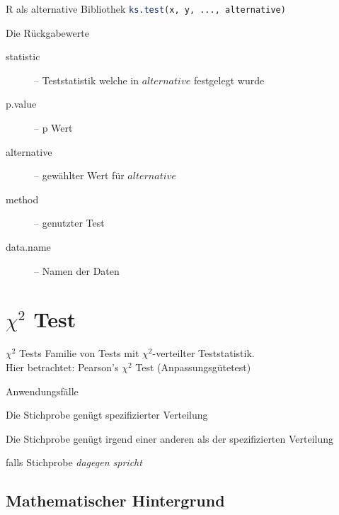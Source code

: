 \documentclass{beamer}
\begin{document}
\begin{frame}{\insertsubsection}

\begin{block}{R als alternative Bibliothek}
	\lstinline[language=R] $ks.test(x, y, ..., alternative)$
\end{block}

\begin{block}{Die Rückgabewerte}
\begin{description}
	\item[statistic] -- Teststatistik welche in $alternative$ festgelegt wurde
	\item[p.value] -- p Wert
	\item[alternative] -- gewählter Wert für $alternative$
	\item[method] -- genutzter Test
	\item[data.name] -- Namen der Daten
\end{description}
\end{block}

\end{frame}

\section{$\chi^2$ Test}
\begin{frame}{\insertsection}
\begin{block}{$\chi^2$ Tests}
	Familie von Tests mit $\chi^2$-verteilter Teststatistik.
	\\
	Hier betrachtet: Pearson's $\chi^2$ Test (Anpassungsgütetest)
\end{block}
\begin{block}{Anwendungsfälle}
	\begin{description}[Alternativhypothese]
	\item[Nullhypothese] Die Stichprobe genügt spezifizierter Verteilung
	\item[Alternativhypothese] Die Stichprobe genügt irgend einer anderen als der spezifizierten Verteilung
	\item[Verwerfen von $H_0$] falls Stichprobe \emph{dagegen spricht}
	\end{description}
\end{block}
\end{frame}

\subsection{Mathematischer Hintergrund}
\end{document}
